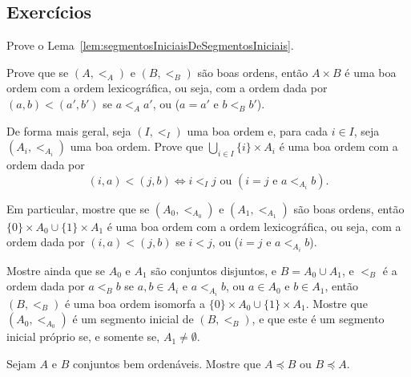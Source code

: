 
\subsection{Exercícios}
\begin{exercise}
    Prove o Lema~\ref{lem:segmentosIniciaisDeSegmentosIniciais}.
\end{exercise}
\begin{exercise}[$\BST$]
    Prove que se $(A, <_A)$ e $(B, <_B)$ são boas ordens, então $A\times B$ é uma boa ordem com a ordem lexicográfica, ou seja, com a ordem dada por $(a, b)<(a', b')$ se $a<_A a'$, ou ($a=a'$ e $b<_B b'$).
\end{exercise}
\begin{exercise}[$Z^-$]
    De forma mais geral, seja $(I, <_I)$ uma boa ordem e, para cada $i\in I$, seja $(A_i, <_{A_i})$ uma boa ordem.
    Prove que $\bigcup_{i\in I} \{i\}\times A_i$ é uma boa ordem com a ordem dada por
    \[
    (i,a)<(j,b)\iff i<_I j \text{ ou } (i=j \text{ e } a<_{A_i} b).
    \]
\end{exercise}
\begin{exercise}[$\BST$]\label{exr:uniaoDeBoasOrdens}
Em particular, mostre que se $(A_0, <_{A_0})$ e $(A_1, <_{A_1})$ são boas ordens, então $\{0\}\times A_0\cup \{1\}\times A_1$ é uma boa ordem com a ordem lexicográfica, ou seja, com a ordem dada por $(i, a)<(j, b)$ se $i<j$, ou ($i=j$ e $a<_{A_i} b$).

Mostre ainda que se $A_0$ e $A_1$ são conjuntos disjuntos, e $B=A_0\cup A_1$, e $<_B$ é a ordem dada por $a<_B b$ se $a, b\in A_i$ e $a<_{A_i} b$, ou $a\in A_0$ e $b\in A_1$, então $(B, <_B)$ é uma boa ordem isomorfa a $\{0\}\times A_0\cup \{1\}\times A_1$.
Mostre que $(A_0, <_{A_0})$ é um segmento inicial de $(B, <_B)$, e que este é um segmento inicial próprio se, e somente se, $A_1\neq \emptyset$.
\end{exercise}

\begin{exercise}[$\BST$]
    Sejam $A$ e $B$ conjuntos bem ordenáveis.
    Mostre que $A\preceq B$ ou $B\preceq A$.
\end{exercise}
